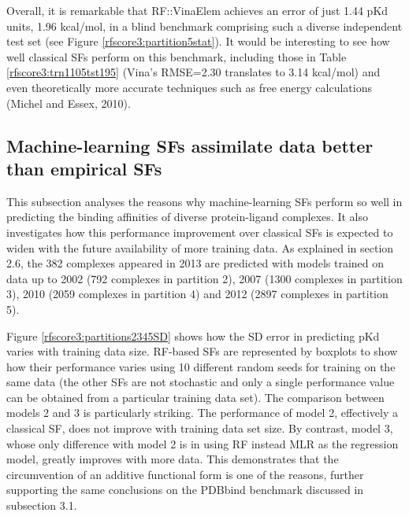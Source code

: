 Overall, it is remarkable that RF::VinaElem achieves an error of just 1.44 pKd units, 1.96 kcal/mol, in a blind benchmark comprising such a diverse independent test set (see Figure \ref{rfscore3:partition5stat}). It would be interesting to see how well classical SFs perform on this benchmark, including those in Table \ref{rfscore3:trn1105tst195} (Vina's RMSE=2.30 translates to 3.14 kcal/mol) and even theoretically more accurate techniques such as free energy calculations (Michel and Essex, 2010).

\subsection{Machine-learning SFs assimilate data better than empirical SFs}

This subsection analyses the reasons why machine-learning SFs perform so well in predicting the binding affinities of diverse protein-ligand complexes. It also investigates how this performance improvement over classical SFs is expected to widen with the future availability of more training data. As explained in section 2.6, the 382 complexes appeared in 2013 are predicted with models trained on data up to 2002 (792 complexes in partition 2), 2007 (1300 complexes in partition 3), 2010 (2059 complexes in partition 4) and 2012 (2897 complexes in partition 5). 

Figure \ref{rfscore3:partitions2345SD} shows how the SD error in predicting pKd varies with training data size. RF-based SFs are represented by boxplots to show how their performance varies using 10 different random seeds for training on the same data (the other SFs are not stochastic and only a single performance value can be obtained from a particular training data set). The comparison between models 2 and 3 is particularly striking. The performance of model 2, effectively a classical SF, does not improve with training data set size. By contrast, model 3, whose only difference with model 2 is in using RF instead MLR as the regression model, greatly improves with more data. This demonstrates that the circumvention of an additive functional form is one of the reasons, further supporting the same conclusions on the PDBbind benchmark discussed in subsection 3.1.

